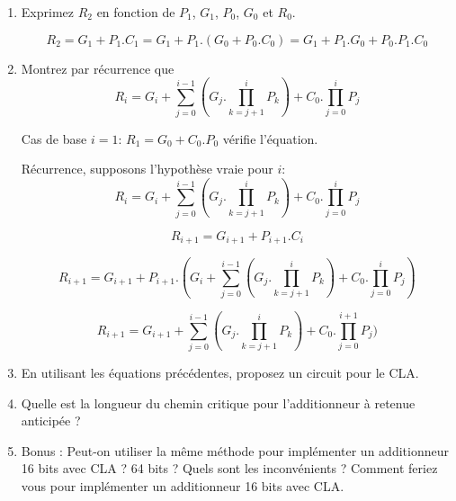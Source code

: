 \documentclass[a4paper,10pt]{exam}
\begin{document}
\begin{enumerate}
\item Exprimez $R_2$ en fonction de $P_1$, $G_1$, $P_0$, $G_0$ et $R_0$.
\begin{solution}
  $$ R_2 = G_1 + P_1.C_1 = G_1 + P_1.(G_0 + P_0.C_0) = G_1 + P_1.G_0 + P_0.P_1.C_0$$
\end{solution}

\item Montrez par récurrence que
  $$R_i = G_i + \sum^{i-1}_{j=0}{(G_j.\prod^i_{k=j+1}{P_k})} + C_0.\prod^i_{j=0}{P_j}$$

\begin{solution}
  Cas de base $i=1$: $R_1 = G_0 + C_0.P_0$ vérifie l'équation.

  Récurrence, supposons l'hypothèse vraie pour $i$:
  $$R_i = G_i + \sum^{i-1}_{j=0}{(G_j.\prod^i_{k=j+1}{P_k})} +
  C_0.\prod^i_{j=0}{P_j}$$

  $$R_{i+1} = G_{i+1} + P_{i+1}.C_{i}$$

  $$R_{i+1} = G_{i+1} + P_{i+1}.(G_i + \sum^{i-1}_{j=0}{(G_j.\prod^i_{k=j+1}{P_k})} +
  C_0.\prod^i_{j=0}{P_j})$$

  $$ R_{i+1} = G_{i+1} + \sum^{i-1}_{j=0}{(G_j.\prod^i_{k=j+1}{P_k})} +
  C_0.\prod^{i+1}_{j=0}{P_j})$$
\end{solution}

\item En utilisant les équations précédentes, proposez un circuit pour le CLA.
\item Quelle est la longueur du chemin critique pour l'additionneur à retenue
  anticipée ?
\begin{solution}

\end{solution}

\item Bonus : Peut-on utiliser la même méthode pour implémenter un additionneur
  16 bits avec CLA ? 64 bits ? Quels sont les inconvénients ? Comment feriez
  vous pour implémenter un additionneur 16 bits avec CLA.
\end{enumerate}
\end{document}
